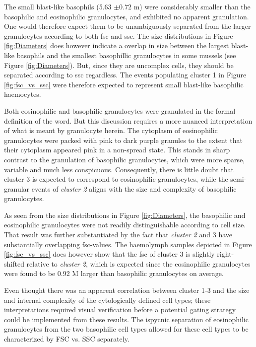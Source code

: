 The small blast-like basophils (5.63 $\pm{0.72}$ \micro m) were considerably smaller than the basophilic and eosinophilic granulocytes, and exhibited no apparent granulation. One would therefore expect them to be unambiguously separated from the larger granulocytes according to both \acrshort{fsc} and \acrshort{ssc}. The size distributions in Figure \ref{fig:Diameters} does however indicate a overlap in size between the largest blast-like basophils and the smallest basophillic granulocytes in some mussels (see Figure \ref{fig:Diameters}). But, since they are uncomplex cells, they should be separated according to \acrshort{ssc} regardless. The events populating cluster 1 in Figure \ref{fig:fsc_vs_ssc} were therefore expected to represent small blast-like basophilic haemocytes. 

Both eosinophilic and basophilic granulocytes were granulated in the formal definition of the word. But this discussion requires a more nuanced interpretation of what is meant by granulocyte herein. The cytoplasm of eosinophilic granulocytes were packed with pink to dark purple granules to the extent that their cytoplasm appeared pink in a non-spread state. This stands in sharp contrast to the granulation of basophilic granulocytes, which were more sparse, variable and much less conspicuous. Consequently, there is little doubt that cluster 3 is expected to correspond to eosinophilic granulocytes, while the semi-granular events of \emph{\emph{cluster 2}} aligns with the size and complexity of basophilic granulocytes.

As seen from the size distributions in Figure \ref{fig:Diameters}, the basophilic and eosinophilic granulocytes were not readily distinguishable according to cell size. That result was further substantiated by the fact that \emph{cluster 2} and 3 have substantially overlapping \acrshort{fsc}-values. The haemolymph samples depicted in Figure \ref{fig:fsc_vs_ssc} does however show that the \acrshort{fsc} of cluster 3 is slightly right-shifted relative to \emph{cluster 2}, which is expected since the eosinophilic granulocytes were found to be 0.92 \micro M larger than basophilic granulocytes on average.

Even thought there was an apparent correlation between cluster 1-3 and the size and internal complexity of the cytologically defined cell types; these interpretations required visual verification before a potential gating strategy could be implemented from these results. The ispycnic separation of eosinophilic granulocytes from the two basophilic cell types allowed for these cell types to be characterized by FSC vs. SSC separately.

